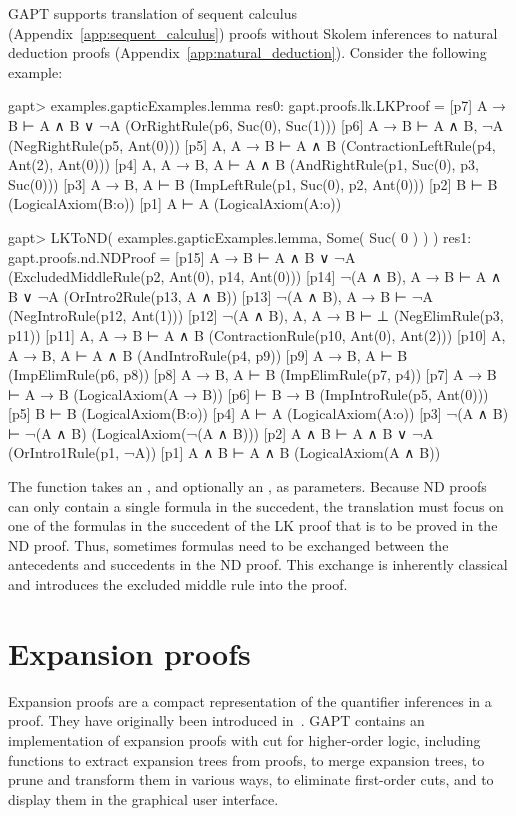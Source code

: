 \documentclass[a4paper,11pt]{book}
\newcommand{\cli}[1]{{\ttfamily {#1}}}
\begin{document}
GAPT supports translation of sequent calculus
(Appendix~\ref{app:sequent_calculus}) proofs without Skolem inferences
to natural deduction proofs (Appendix~\ref{app:natural_deduction}).
Consider the following example:
\begin{clilisting}
gapt> examples.gapticExamples.lemma
res0: gapt.proofs.lk.LKProof =
[p7] A → B ⊢ A ∧ B ∨ ¬A    (OrRightRule(p6, Suc(0), Suc(1)))
[p6] A → B ⊢ A ∧ B, ¬A    (NegRightRule(p5, Ant(0)))
[p5] A, A → B ⊢ A ∧ B    (ContractionLeftRule(p4, Ant(2), Ant(0)))
[p4] A, A → B, A ⊢ A ∧ B    (AndRightRule(p1, Suc(0), p3, Suc(0)))
[p3] A → B, A ⊢ B    (ImpLeftRule(p1, Suc(0), p2, Ant(0)))
[p2] B ⊢ B    (LogicalAxiom(B:o))
[p1] A ⊢ A    (LogicalAxiom(A:o))

gapt> LKToND( examples.gapticExamples.lemma, Some( Suc( 0 ) ) )
res1: gapt.proofs.nd.NDProof =
[p15] A → B ⊢ A ∧ B ∨ ¬A    (ExcludedMiddleRule(p2, Ant(0), p14, Ant(0)))
[p14] ¬(A ∧ B), A → B ⊢ A ∧ B ∨ ¬A    (OrIntro2Rule(p13, A ∧ B))
[p13] ¬(A ∧ B), A → B ⊢ ¬A    (NegIntroRule(p12, Ant(1)))
[p12] ¬(A ∧ B), A, A → B ⊢ ⊥    (NegElimRule(p3, p11))
[p11] A, A → B ⊢ A ∧ B    (ContractionRule(p10, Ant(0), Ant(2)))
[p10] A, A → B, A ⊢ A ∧ B    (AndIntroRule(p4, p9))
[p9] A → B, A ⊢ B    (ImpElimRule(p6, p8))
[p8] A → B, A ⊢ B    (ImpElimRule(p7, p4))
[p7] A → B ⊢ A → B    (LogicalAxiom(A → B))
[p6]  ⊢ B → B    (ImpIntroRule(p5, Ant(0)))
[p5] B ⊢ B    (LogicalAxiom(B:o))
[p4] A ⊢ A    (LogicalAxiom(A:o))
[p3] ¬(A ∧ B) ⊢ ¬(A ∧ B)    (LogicalAxiom(¬(A ∧ B)))
[p2] A ∧ B ⊢ A ∧ B ∨ ¬A    (OrIntro1Rule(p1, ¬A))
[p1] A ∧ B ⊢ A ∧ B    (LogicalAxiom(A ∧ B))

\end{clilisting}
The \cli{LKToND} function takes an \cli{LKProof}, and optionally an
\cli{Option[SequentIndex]}, as parameters.  Because ND proofs can only
contain a single formula in the succedent, the translation must focus on one
of the formulas in the succedent of the LK proof that is to be proved in the ND
proof.
Thus, sometimes formulas need to be exchanged between the antecedents and
succedents in the ND proof. This exchange is inherently classical and introduces
the excluded middle rule into the proof.

\section{Expansion proofs}

Expansion proofs are a compact representation of the quantifier inferences in a
proof.  They have originally been introduced in~\cite{Miller87Compact}.  GAPT
contains an implementation of expansion proofs with cut for higher-order logic,
including functions to extract expansion trees from proofs, to merge expansion
trees, to prune and transform them in various ways, to eliminate first-order
cuts, and to display them in the graphical user interface.
\end{document}
